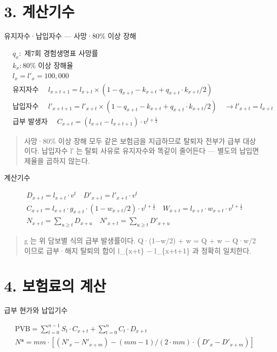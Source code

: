 \documentclass[10pt,a4paper]{article}
\begin{document}
\section*{3. 계산기수}

유지자수·납입자수 — 사망·80\% 이상 장해

\begin{align*}
& q_x : \text{ 제}7\text{회 경험생명표 사망률} \\
& k_x : 80\% \text{ 이상 장해율} \\[4pt]
& l_x = l'_x = 100,000 \\
& \text{유지자수 } \quad l_{x+t+1} = l_{x+t} \times ( 1 - q_{x+t} - k_{x+t} + q_{x+t}\cdot k_{x+t}/2 ) \\
& \text{납입자수 } \quad l'_{x+t+1} = l'_{x+t} \times ( 1 - q_{x+t} - k_{x+t} + q_{x+t}\cdot k_{x+t}/2 ) \quad \to l'_{x+t} = l_{x+t} \\
& \text{급부 발생자 } \quad C_{x+t} = ( l_{x+t} - l_{x+t+1} )\cdot v^{t+\tfrac{1}{2}}
\end{align*}

\begin{quote}\small
사망·80\% 이상 장해 모두 같은 보험금을 지급하므로 탈퇴자 전부가 급부 대상이다. 납입자수 l′ 는 탈퇴 사유로 유지자수와 똑같이 줄어든다 — 별도의 납입면제율을 곱하지 않는다.
\end{quote}

계산기수

\begin{align*}
& D_{x+t} = l_{x+t}\cdot v^t \quad D'_{x+t} = l'_{x+t}\cdot v^t \\
& C_{x+t} = l_{x+t}\cdot g_{x+t}\cdot ( 1 - w_{x+t}/2 )\cdot v^{t+\tfrac{1}{2}} \quad W_{x+t} = l_{x+t}\cdot w_{x+t}\cdot v^{t+\tfrac{1}{2}} \\
& N_{x+t} = \sum_{u\ge t} D_{x+u} \quad N'_{x+t} = \sum_{u\ge t} D'_{x+u}
\end{align*}

\begin{quote}\small
g 는 위 담보별 식의 급부 발생률이다. Q·(1−w/2) + w = Q + w − Q·w/2 이므로 급부·해지 탈퇴의 합이 l\_\{x+t\} − l\_\{x+t+1\} 과 정확히 일치한다.
\end{quote}

\section*{4. 보험료의 계산}

급부 현가와 납입기수

\begin{align*}
& \mathrm{PVB} = \sum_{t=0}^{n-1} S_t\cdot C_{x+t} + \sum_{t=0}^{n} C_t\cdot D_{x+t} \\
& N* = mm \cdot [ ( N'_x - N'_{x+m} ) - ( mm-1 )/( 2\cdot mm )\cdot ( D'_x - D'_{x+m} ) ]
\end{align*}
\end{document}
